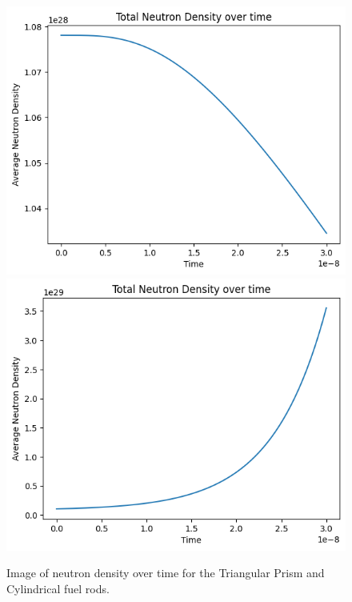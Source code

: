 \documentclass[letterpaper, 12pt]{article}
\begin{document}
         \begin{figure}[b!]
            \centering
            \includegraphics[width=0.4\linewidth]{Graphs/Cylinder-Prism-Far-Graph.png}
            \includegraphics[width=0.4\linewidth]{Graphs/Cylinder-Prism-Close-Graph.png}
            \caption{Image of neutron density over time for the Triangular Prism and Cylindrical fuel rods.}
            \label{img:Prism-and-Cylinder-density}
         \end{figure}
\end{document}
